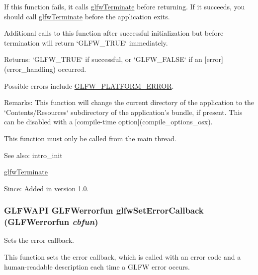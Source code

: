 If this function fails, it calls \hyperlink{group__init_gfd90e6fd4819ea9e22e5e739519a6504}{glfwTerminate} before returning. If it succeeds, you should call \hyperlink{group__init_gfd90e6fd4819ea9e22e5e739519a6504}{glfwTerminate} before the application exits.

Additional calls to this function after successful initialization but before termination will return `GLFW\_\-TRUE` immediately.

\begin{Desc}
\item[Returns:]`GLFW\_\-TRUE` if successful, or `GLFW\_\-FALSE` if an \mbox{[}error\mbox{]}(error\_\-handling) occurred.\end{Desc}
Possible errors include \hyperlink{group__errors_gd44162d78100ea5e87cdd38426b8c7a1}{GLFW\_\-PLATFORM\_\-ERROR}.

\begin{Desc}
\item[Remarks:]This function will change the current directory of the application to the `Contents/Resources` subdirectory of the application's bundle, if present. This can be disabled with a \mbox{[}compile-time option\mbox{]}(compile\_\-options\_\-osx).\end{Desc}
This function must only be called from the main thread.

\begin{Desc}
\item[See also:]intro\_\-init 

\hyperlink{group__init_gfd90e6fd4819ea9e22e5e739519a6504}{glfwTerminate}\end{Desc}
\begin{Desc}
\item[Since:]Added in version 1.0. \end{Desc}
\hypertarget{group__init_g5919096b958c47102126061fb5a6f9c3}{
\subsubsection[glfwSetErrorCallback]{\setlength{\rightskip}{0pt plus 5cm}GLFWAPI {\bf GLFWerrorfun} glfwSetErrorCallback ({\bf GLFWerrorfun} {\em cbfun})}}
\label{group__init_g5919096b958c47102126061fb5a6f9c3}


Sets the error callback. 

This function sets the error callback, which is called with an error code and a human-readable description each time a GLFW error occurs.

